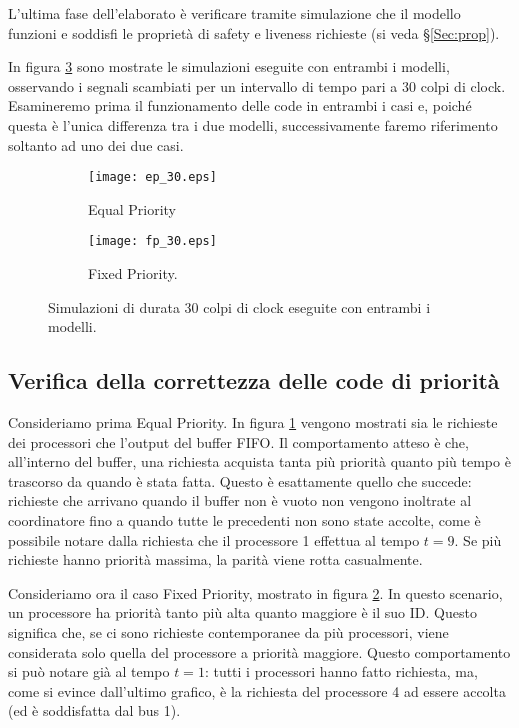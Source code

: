 L'ultima fase dell'elaborato è verificare tramite simulazione che il modello funzioni e soddisfi le proprietà di safety e liveness richieste (si veda §\ref{Sec:prop}).

In figura \ref{Fig:sims_30} sono mostrate le simulazioni eseguite con entrambi i modelli, osservando i segnali scambiati per un intervallo di tempo pari a 30 colpi di clock. Esamineremo prima il funzionamento delle code in entrambi i casi e, poiché questa è l'unica differenza tra i due modelli, successivamente faremo riferimento soltanto ad uno dei due casi.

\begin{figure}
\centering
\vspace{-2cm}
\begin{subfigure}[t]{\textwidth}
	\centering
	\texttt{[image: ep\_30.eps]}
	\vspace{-2.8cm}
	\caption{Equal Priority}
	\label{Fig:sim_ep_30}
\end{subfigure}
\begin{subfigure}[t]{\textwidth}
	\centering
	\texttt{[image: fp\_30.eps]}
	\vspace{-2.8cm}
	\caption{Fixed Priority.}
	\label{Fig:sim_fp_30}
\end{subfigure}
\caption{Simulazioni di durata 30 colpi di clock eseguite con entrambi i modelli.}
\label{Fig:sims_30}
\end{figure}

\subsection{Verifica della correttezza delle code di priorità}
Consideriamo prima Equal Priority. In figura \ref{Fig:sim_ep_30} vengono mostrati sia le richieste dei processori che l'output del buffer FIFO. Il comportamento atteso è che, all'interno del buffer, una richiesta acquista tanta più priorità quanto più tempo è trascorso da quando è stata fatta. Questo è esattamente quello che succede: richieste che arrivano quando il buffer non è vuoto non vengono inoltrate al coordinatore fino a quando tutte le precedenti non sono state accolte, come è possibile notare dalla richiesta che il processore 1 effettua al tempo $t=9$. Se più richieste hanno priorità massima, la parità viene rotta casualmente.

Consideriamo ora il caso Fixed Priority, mostrato in figura \ref{Fig:sim_fp_30}. In questo scenario, un processore ha priorità tanto più alta quanto maggiore è il suo ID. Questo significa che, se ci sono richieste contemporanee da più processori, viene considerata solo quella del processore a priorità maggiore. Questo comportamento si può notare già al tempo $t=1$: tutti i processori hanno fatto richiesta, ma, come si evince dall'ultimo grafico, è la richiesta del processore 4 ad essere accolta (ed è soddisfatta dal bus 1).


